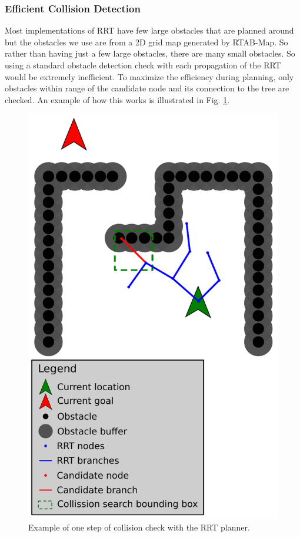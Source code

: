 \documentclass[letterpaper, 10 pt, conference]{ieeeconf}  %
\begin{document}
\subsubsection{Efficient Collision Detection}
Most implementations of RRT have few large obstacles that are planned around but the obstacles we use are from a 2D grid map generated by RTAB-Map. So rather than having just a few large obstacles, there are many small obstacles. So using a standard obstacle detection check with each propagation of the RRT would be extremely inefficient. To maximize the efficiency during planning, only obstacles within range of the candidate node and its connection to the tree are checked. An example of how this works is illustrated in Fig. \ref{fig:rrt_sample}.

\begin{figure}
\centering
\includegraphics[width=0.8\linewidth]{rrt_sample}
\caption{Example of one step of collision check with the RRT planner.}
\label{fig:rrt_sample}
\end{figure}
\end{document}
